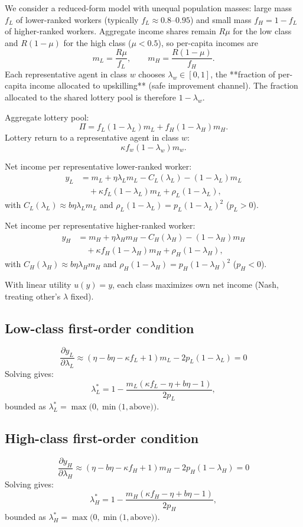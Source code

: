 \documentclass[11pt]{article}
\begin{document}
We consider a reduced-form model with unequal population masses: large mass $f_L$ of lower-ranked workers (typically $f_L \approx 0.8$--$0.95$) and small mass $f_H = 1 - f_L$ of higher-ranked workers. Aggregate income shares remain $R\mu$ for the low class and $R(1-\mu)$ for the high class ($\mu < 0.5$), so per-capita incomes are
\[
m_L = \frac{R \mu}{f_L}, \qquad m_H = \frac{R (1-\mu)}{f_H}.
\]
Each representative agent in class $w$ chooses $\lambda_w \in [0,1]$, the **fraction of per-capita income allocated to upskilling** (safe improvement channel). The fraction allocated to the shared lottery pool is therefore $1 - \lambda_w$.

Aggregate lottery pool:
\[
\Pi = f_L (1 - \lambda_L) m_L + f_H (1 - \lambda_H) m_H.
\]
Lottery return to a representative agent in class $w$:
\[
\kappa f_w (1 - \lambda_w) m_w.
\]

Net income per representative lower-ranked worker:
\begin{align*}
y_L &= m_L + \eta \lambda_L m_L - C_L(\lambda_L) - (1 - \lambda_L) m_L \\
    &\quad + \kappa f_L (1 - \lambda_L) m_L + \rho_L(1 - \lambda_L),
\end{align*}
with $C_L(\lambda_L) \approx b \eta \lambda_L m_L$ and $\rho_L(1 - \lambda_L) = p_L (1 - \lambda_L)^2$ ($p_L > 0$).

Net income per representative higher-ranked worker:
\begin{align*}
y_H &= m_H + \eta \lambda_H m_H - C_H(\lambda_H) - (1 - \lambda_H) m_H \\
    &\quad + \kappa f_H (1 - \lambda_H) m_H + \rho_H(1 - \lambda_H),
\end{align*}
with $C_H(\lambda_H) \approx b \eta \lambda_H m_H$ and $\rho_H(1 - \lambda_H) = p_H (1 - \lambda_H)^2$ ($p_H < 0$).

With linear utility $u(y) = y$, each class maximizes own net income (Nash, treating other's $\lambda$ fixed).

\subsection{Low-class first-order condition}
\[
\frac{\partial y_L}{\partial \lambda_L} \approx (\eta - b\eta - \kappa f_L + 1) m_L - 2 p_L (1 - \lambda_L) = 0
\]
Solving gives:
\[
\lambda_L^* = 1 - \frac{m_L (\kappa f_L - \eta + b\eta - 1)}{2 p_L},
\]
bounded as $\lambda_L^* = \max\!\bigl(0, \min\!\bigl(1, \text{above}\bigr)\bigr)$.

\subsection{High-class first-order condition}
\[
\frac{\partial y_H}{\partial \lambda_H} \approx (\eta - b\eta - \kappa f_H + 1) m_H - 2 p_H (1 - \lambda_H) = 0
\]
Solving gives:
\[
\lambda_H^* = 1 - \frac{m_H (\kappa f_H - \eta + b\eta - 1)}{2 p_H},
\]
bounded as $\lambda_H^* = \max\!\bigl(0, \min\!\bigl(1, \text{above}\bigr)\bigr)$.
\end{document}
